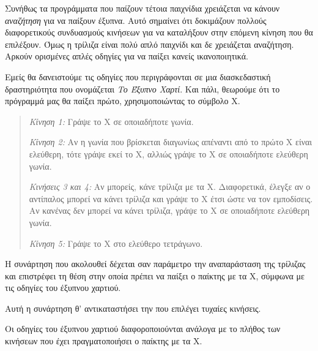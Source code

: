 \documentclass[a4paper,11pt,oneside]{book}
\begin{document}
Συνήθως τα προγράμματα που παίζουν τέτοια παιχνίδια χρειάζεται να κάνουν \emph{αναζήτηση} για να παίξουν έξυπνα. Αυτό σημαίνει ότι δοκιμάζουν πολλούς διαφορετικούς συνδυασμούς κινήσεων για να καταλήξουν στην επόμενη κίνηση που θα επιλέξουν. Όμως η τρίλιζα είναι πολύ απλό παιχνίδι και δε χρειάζεται αναζήτηση. Αρκούν ορισμένες απλές οδηγίες για να παίξει κανείς ικανοποιητικά. 

\clearpage
{}
Εμείς θα δανειστούμε τις οδηγίες που περιγράφονται σε μια διασκεδαστική δραστηριότητα που ονομάζεται \emph{Το Έξυπνο Χαρτί}. Και πάλι, θεωρούμε ότι το πρόγραμμά μας θα παίξει πρώτο, χρησιμοποιώντας το σύμβολο Χ.

\vspace{-\parskip}\begin{quote}
\emph{Κίνηση 1:} Γράψε το Χ σε οποιαδήποτε γωνία.

\emph{Κίνηση 2:} Αν η γωνία που βρίσκεται διαγωνίως απέναντι από το πρώτο Χ είναι ελεύθερη, τότε γράψε εκεί το Χ, αλλιώς γράψε το Χ
σε οποιαδήποτε ελεύθερη γωνία.

\emph{Κινήσεις 3 και 4:} Αν μπορείς, κάνε τρίλιζα με τα Χ. Διαφορετικά, έλεγξε αν ο αντίπαλος μπορεί να κάνει τρίλιζα και γράψε το Χ έτσι ώστε να τον εμποδίσεις. Αν κανένας δεν μπορεί να κάνει τρίλιζα, γράψε το Χ σε οποιαδήποτε ελεύθερη γωνία.

\emph{Κίνηση 5:} Γράψε το Χ στο ελεύθερο τετράγωνο.
\end{quote}\vspace{-2\parskip}

Η συνάρτηση  που ακολουθεί δέχεται σαν παράμετρο την αναπαράσταση  της τρίλιζας και επιστρέφει τη θέση στην οποία πρέπει να παίξει ο παίκτης με τα Χ, σύμφωνα με τις οδηγίες του έξυπνου χαρτιού. 

Αυτή η συνάρτηση θ' αντικαταστήσει την  που επιλέγει τυχαίες κινήσεις.


Οι οδηγίες του έξυπνου χαρτιού διαφοροποιούνται ανάλογα με το πλήθος των κινήσεων που έχει πραγματοποιήσει ο παίκτης με τα Χ. 

\end{document}
